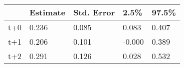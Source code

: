 \begin{tabular}{lllll}
  \toprule
  & Estimate & Std. Error & 2.5\% & 97.5\% \\ 
  \midrule
t+0 & 0.236 & 0.085 & 0.083 & 0.407 \\ 
  t+1 & 0.206 & 0.101 & -0.000 & 0.389 \\ 
  t+2 & 0.291 & 0.126 & 0.028 & 0.532 \\ 
   \bottomrule
\end{tabular}
